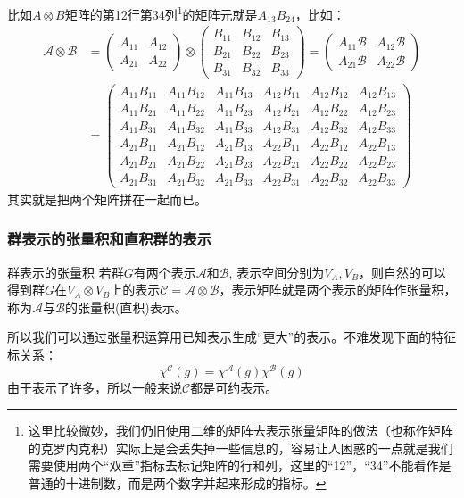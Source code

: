比如$A\otimes B$矩阵的第12行第34列\footnote{这里比较微妙，我们仍旧使用二维的矩阵去表示张量矩阵的做法（也称作矩阵的克罗内克积）实际上是会丢失掉一些信息的，容易让人困惑的一点就是我们需要使用两个“双重”指标去标记矩阵的行和列，这里的“12”，“34”不能看作是普通的十进制数，而是两个数字并起来形成的指标。}的矩阵元就是$A_{13}B_{24}$，比如：
\begin{equation}
	\begin{aligned}
		\mathcal{A}\otimes \mathcal{B}&=\begin{pmatrix}
			A_{11}&A_{12} \\
			A_{21}&A_{22}
		\end{pmatrix}\otimes \begin{pmatrix}
			B_{11} & B_{12}  & B_{13} \\
			B_{21}& B_{22}  &  B_{23}\\
			B_{31} & B_{32}  & B_{33}
		\end{pmatrix}= \begin{pmatrix}
			A_{11}\mathcal{B}&A_{12}\mathcal{B} \\
			A_{21}\mathcal{B}&A_{22}\mathcal{B}
		\end{pmatrix}\\
		&=\begin{pmatrix}
			A_{11}B_{11}&  A_{11}B_{12}&A_{11}B_{13}  &A_{12}B_{11}&  A_{12}B_{12}&A_{12}B_{13} \\
			A_{11}B_{21}&A_{11}B_{22}  &A_{11}B_{23}  &A_{12}B_{21}&A_{12}B_{22}  &A_{12}B_{23}  \\
			A_{11}B_{31}&A_{11}B_{32}  &A_{11}B_{33}  &A_{12}B_{31}&A_{12}B_{32}  &A_{12}B_{33} \\
			A_{21}B_{11}&  A_{21}B_{12}&A_{21}B_{13}  &A_{22}B_{11}&  A_{22}B_{12}&A_{22}B_{13} \\
			A_{21}B_{21}&A_{21}B_{22}  &A_{21}B_{23}  &A_{22}B_{21}&A_{22}B_{22}  &A_{22}B_{23}  \\
			A_{21}B_{31}&A_{21}B_{32}  &A_{21}B_{33}  &A_{22}B_{31}&A_{22}B_{32}  &A_{22}B_{33} 
		\end{pmatrix}
	\end{aligned}
\end{equation}
其实就是把两个矩阵拼在一起而已。
\subsubsection*{群表示的张量积和直积群的表示}
\begin{define}{群表示的张量积}
	若群$G$有两个表示$\mathscr{A}$和$\mathscr{B}$, 表示空间分别为$V_A,V_B$，则自然的可以得到群$G$在$V_A\otimes V_B$上的表示$\mathscr{C}=\mathscr{A}\otimes\mathscr{B}$，表示矩阵就是两个表示的矩阵作张量积，称为$\mathscr{A}$与$\mathscr{B}$的张量积(直积)表示。
\end{define}
所以我们可以通过张量积运算用已知表示生成“更大”的表示。不难发现下面的特征标关系：
\[\chi^\mathscr{C}(g)=\chi^\mathscr{A}(g)\chi^\mathscr{B}(g)\]
由于表示了许多，所以一般来说$\mathscr{C}$都是可约表示。

